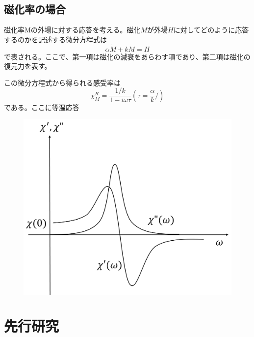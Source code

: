 \documentclass[11pt,a4j]{jreport}
\begin{document}
\section{磁化率の場合}
磁化率Mの外場に対する応答を考える。磁化$M$が外場$H$に対してどのように応答するのかを記述する微分方程式は
\begin{equation}
 \alpha\dot{M}+kM=H 
\end{equation}
で表される。ここで、第一項は磁化の減衰をあらわす項であり、第二項は磁化の復元力を表す。\par
この微分方程式から得られる感受率は
\begin{equation}
  \chi_M^R = \frac{1/k}{1-i\omega\tau} \left(\tau= \frac{\alpha}{k}/\right)
\end{equation}
である。ここに等温応答
\begin{figure}[htbp]
  \centering
  \vspace{10mm}
  \includegraphics[width=160mm]{./figure/outou.png}
  \label{outou}
\end{figure}



\chapter{先行研究}
\end{document}
